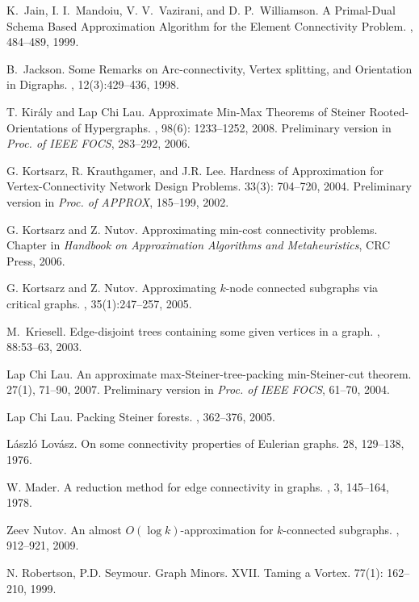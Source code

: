 \documentclass[11pt]{article}
\begin{document}
\begin{thebibliography}{55}
K.~Jain, I. I.~Mandoiu, V. V.~Vazirani, and D. P.~Williamson.
\newblock A Primal-Dual Schema Based Approximation Algorithm for the
Element Connectivity Problem. 
, 484--489, 1999.

B.~Jackson.
\newblock Some Remarks on Arc-connectivity, Vertex splitting, and
Orientation in Digraphs.
, 12(3):429--436, 1998.

T. Kir\'{a}ly and Lap Chi Lau.
\newblock Approximate Min-Max Theorems of Steiner Rooted-Orientations of Hypergraphs.
, 98(6): 1233--1252, 2008.
\newblock Preliminary version in {\em Proc. of IEEE FOCS}, 283--292, 2006.
 
G. Kortsarz, R. Krauthgamer, and J.R. Lee.
\newblock Hardness of Approximation for Vertex-Connectivity Network
Design Problems.
 33(3): 704--720, 2004.
\newblock Preliminary version in {\em Proc. of APPROX}, 185--199, 2002.

G. Kortsarz and Z. Nutov.
\newblock Approximating min-cost connectivity problems.
\newblock Chapter in {\em Handbook on Approximation Algorithms and Metaheuristics}, CRC Press, 
2006.

G. Kortsarz and Z. Nutov.
\newblock Approximating $k$-node connected subgraphs via critical graphs.
, 35(1):247--257, 2005.

M.~Kriesell.
\newblock Edge-disjoint trees containing some given vertices in a
graph.
, 88:53--63, 2003.

Lap Chi Lau.
\newblock An approximate max-Steiner-tree-packing min-Steiner-cut
theorem.
 27(1), 71--90, 2007.
\newblock Preliminary version in {\em Proc. of IEEE FOCS}, 61--70, 2004.

Lap Chi Lau.
\newblock Packing Steiner forests.
, 362--376, 2005.

L\'{a}szl\'{o} Lov\'{a}sz.
\newblock On some connectivity properties of Eulerian graphs.
 28, 129--138, 1976.

W. Mader.
\newblock A reduction method for edge connectivity in graphs.
, 3, 145--164, 1978.

Zeev Nutov.
\newblock An almost $O(\log k)$-approximation for $k$-connected
subgraphs. 
, 912--921, 2009.

N. Robertson, P.D. Seymour.
\newblock Graph Minors. XVII. Taming a Vortex.
 77(1): 162--210, 1999.

\end{thebibliography}
\end{document}

